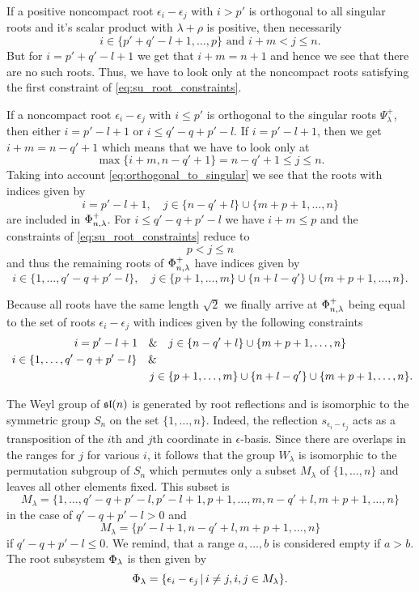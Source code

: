 If a positive noncompact root $\epsilon_i - \epsilon_j$ with $i>p'$ is orthogonal to all singular roots and it's scalar product with $\lambda + \rho$ is positive, then necessarily
\[
 i\in \{ p'+q'-l+1,\ldots, p \} \text{ and } i+m < j\leq n.
\]
But for $i=p'+q'-l+1$ we get that $i+m = n+1$ and hence we see that there are no such roots. Thus, we have to look only at the noncompact roots satisfying the first constraint of \eqref{eq:su_root_constraints}.

If a noncompact root $\epsilon_i - \epsilon_j$ with $i\leq p'$ is orthogonal to the singular roots $\Psi_\lambda^+$, then either $i=p'-l+1$ or $i \leq q'-q + p'-l$. If $i=p'-l+1$, then we get $i+m = n-q'+1$ which means that we have to look only at
\[
 \max \{ i+m, n-q'+1 \} = n-q'+1  \leq j \leq n.
\]
Taking into account \eqref{eq:orthogonal_to_singular} we see that the roots with indices given by
\[
 i = p'-l+1, \quad j \in \{n-q'+l\} \cup \{m+p+1, \ldots,n\}
\]
are included in $\Phi_{n,\lambda}^+$. For  $i\leq q'-q + p'-l$ we have $i+m \leq p$ and the constraints of \eqref{eq:su_root_constraints} reduce to
\[
 p < j \leq n
\]
and thus the remaining roots of $\Phi_{n,\lambda}^+$ have indices given by
\[
  i \in \{ 1,\ldots, q'-q+p'-l\}, \quad
  j \in \{p+1,\ldots,  m\} \cup \{n+l-q'\} \cup \{m+p+1, \ldots,n\}.
\]

Because all roots have the same length $\sqrt{2}$ we finally arrive at $\Phi_{n,\lambda}^+ $ being equal to the set of roots $\epsilon_i - \epsilon_j$ with indices given by the following constraints
\begin{gather}
  i = p'-l+1 \quad \&\quad  j \in \{n-q'+l\} \cup \{m+p+1, \ldots,n\} \\ \notag
  i \in \{ 1,\ldots, q'-q+p'-l\} \quad \& \hspace{8cm} \\ \notag \hspace{4.5cm}  j \in \{p+1,\ldots,  m\} \cup \{n+l-q'\} \cup \{m+p+1, \ldots,n\}.\notag
\end{gather}

The Weyl group of $\mathfrak{sl}(n)$ is generated by root reflections and is isomorphic to the symmetric group $S_n$ on the set $\{1,\ldots,n\}$. Indeed, the reflection $s_{\epsilon_i - \epsilon_j}$ acts as a transposition of the $i$th and $j$th coordinate in $\epsilon$-basis. Since there are overlaps in the ranges for $j$ for various $i$, it follows that the group $W_\lambda$ is isomorphic to the permutation subgroup of $S_n$ which permutes only a subset $M_\lambda$ of $\{1,\ldots,n\}$ and leaves all other elements fixed. This subset is
\[
 M_\lambda =  \{ 1,\ldots, q'-q+p'-l, p'-l+1, p+1,\ldots,m, n-q'+l,m+p+1,\ldots,n\}
\]
in the case of $q'-q+p'-l > 0$ and
\[
  M_\lambda =  \{p'-l+1,n-q'+l,m+p+1,\ldots,n\}
\]
if $q'-q+p'-l \leq 0.$ We remind, that a range $a,\ldots,b$ is considered empty if $a>b$. The root subsystem $\Phi_\lambda$ is then given by
\[
 \Phi_\lambda = \{ \epsilon_i - \epsilon_j \,|\, i\neq j, i,j\in M_\lambda \}.
\]


